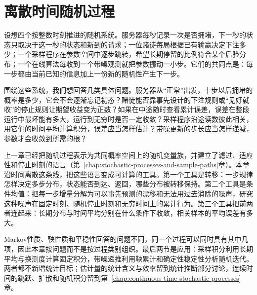 \chapter{离散时间随机过程}
\label{chap:discrete-time-stochastic-processes}
\label{chap:random-sequences-and-processes}
\label{chap:stochastic-processes-and-approximation}

设想四个按整数时刻推进的随机系统。服务器每秒记录一次是否拥堵，下一秒的状态只取决于这一秒的状态和新到的请求；一位赌徒每局根据已有输赢决定下注多少；一个采样程序在参数空间中逐步跳转，希望长期停留的比例符合某个后验分布；一个在线算法每收到一个带噪观测就把参数挪动一小步。它们的共同点是：每一步都由当前已知的信息加上一份新的随机性产生下一步。

围绕这些系统，我们想回答几类具体问题。服务器从“正常”出发，十步以后拥堵的概率是多少，它会不会逐渐忘记初态？赌徒能否靠事先设计的下注规则或“见好就收”的停止规则让期望收益变为正数？如果在中途随时查看累计误差，误差在整段运行中最坏能有多大，运行到无穷时是否一定收敛？采样程序沿途读数彼此相关，用它们的时间平均计算积分，误差应当怎样估计？带噪更新的步长应当怎样递减，参数才会收敛到所需的根？

上一章已经把随机过程表示为共同概率空间上的随机变量族，并建立了滤过、适应性和停止时刻的语言（第~\ref{chap:stochastic-processes-and-sample-paths}章）。本章沿时间离散这条线，把这些语言变成可计算的工具。第一个工具是转移：一步规律怎样决定多步分布，状态能否到达、返回，哪些分布被转移保持。第二个工具是条件均值：把每一步增量分解为可以事先预测的漂移和无法用过去消除的噪声，研究这种噪声在固定时刻、随机停止时刻和无穷时间上的累计行为。第三个工具把前两者连起来：长期分布与时间平均分别在什么条件下收敛，相关样本的平均误差有多大。

Markov性质、鞅性质和平稳性回答的问题不同，同一个过程可以同时具有其中几项，因此本章按问题而不是按过程类别组织。最后两节是应用：采样积分利用长期平均与换测度计算固定积分，带噪递推利用鞅累计和确定性稳定性分析随机迭代。两者都不新增统计目标；估计量的统计含义与效率留到统计推断部分讨论，连续时间的跳跃、扩散和随机积分留到第~\ref{chap:continuous-time-stochastic-processes}章。

